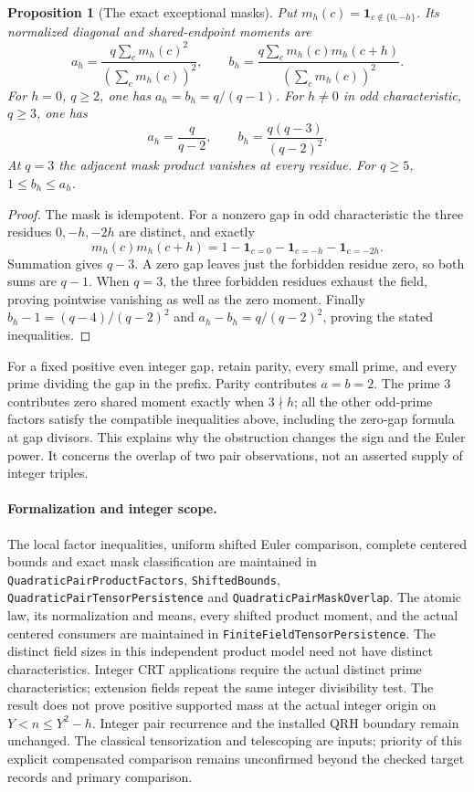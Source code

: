 \documentclass[11pt]{article}
\newtheorem{proposition}[theorem]{Proposition}
\begin{document}
\begin{proposition}[The exact exceptional masks]
\label{prop:tensor-exceptional-mask}
Put \(m_h(c)=\mathbf1_{c\notin\{0,-h\}}\). Its normalized diagonal
and shared-endpoint moments are
\[
 a_h=\frac{q\sum_c m_h(c)^2}{(\sum_c m_h(c))^2},\qquad
 b_h=\frac{q\sum_c m_h(c)m_h(c+h)}{(\sum_c m_h(c))^2}.
\]
For \(h=0\), \(q\ge2\), one has \(a_h=b_h=q/(q-1)\).
For \(h\ne0\) in odd characteristic, \(q\ge3\), one has
\[
 a_h=\frac q{q-2},\qquad b_h=\frac{q(q-3)}{(q-2)^2}.
\]
At \(q=3\) the adjacent mask product vanishes at every residue.
For \(q\ge5\), \(1\le b_h\le a_h\).
\end{proposition}
\begin{proof}
The mask is idempotent. For a nonzero gap in odd characteristic the
three residues \(0,-h,-2h\) are distinct, and exactly
\[
 m_h(c)m_h(c+h)
 =1-\mathbf1_{c=0}-\mathbf1_{c=-h}-\mathbf1_{c=-2h}.
\]
Summation gives \(q-3\). A zero gap leaves just the forbidden residue
zero, so both sums are \(q-1\).
When \(q=3\), the three forbidden residues exhaust the field, proving
pointwise vanishing as well as the zero moment.
Finally \(b_h-1=(q-4)/(q-2)^2\) and
\(a_h-b_h=q/(q-2)^2\), proving the stated inequalities.
\end{proof}

For a fixed positive even integer gap, retain parity, every small prime,
and every prime dividing the gap in the prefix. Parity contributes
\(a=b=2\). The prime \(3\) contributes zero shared moment exactly when
\(3\nmid h\); all the other odd-prime factors satisfy the compatible
inequalities above, including the zero-gap formula at gap divisors.
This explains why the obstruction changes the sign and the Euler power.
It concerns the overlap of two pair observations, not an asserted
supply of integer triples.

\paragraph{Formalization and integer scope.}
The local factor inequalities, uniform shifted Euler comparison, complete
centered bounds and exact mask classification are maintained in
\texttt{QuadraticPairProductFactors}, \texttt{ShiftedBounds},
\texttt{QuadraticPairTensorPersistence} and \texttt{QuadraticPairMaskOverlap}.
The atomic law, its normalization and means, every shifted product moment,
and the actual centered consumers are maintained in
\texttt{FiniteFieldTensorPersistence}.
The distinct field sizes in this independent product model need not have
distinct characteristics. Integer CRT applications require the actual
distinct prime characteristics; extension fields repeat the same
integer divisibility test.
The result does not prove positive supported mass at the actual integer
origin on \(Y<n\le Y^2-h\). Integer pair recurrence and the installed
QRH boundary remain unchanged. The classical tensorization and telescoping
are inputs; priority of this explicit compensated comparison remains
unconfirmed beyond the checked target records and primary comparison.
\end{document}
